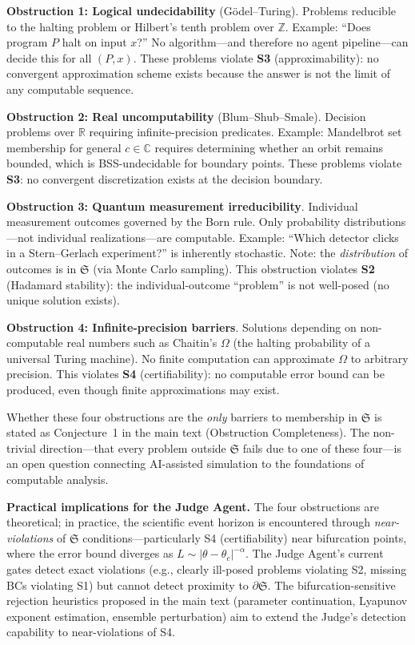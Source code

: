 \documentclass[11pt,a4paper]{article}
\newcommand{\R}{\mathbb{R}}
\newcommand{\Z}{\mathbb{Z}}
\newcommand{\Sclass}{\mathfrak{S}}
\begin{document}
\textbf{Obstruction 1: Logical undecidability} (G\"odel--Turing). Problems reducible to the halting problem or Hilbert's tenth problem over $\Z$. Example: ``Does program $P$ halt on input $x$?'' No algorithm---and therefore no agent pipeline---can decide this for all $(P, x)$. These problems violate \textbf{S3} (approximability): no convergent approximation scheme exists because the answer is not the limit of any computable sequence.

\textbf{Obstruction 2: Real uncomputability} (Blum--Shub--Smale). Decision problems over $\R$ requiring infinite-precision predicates. Example: Mandelbrot set membership for general $c \in \mathbb{C}$ requires determining whether an orbit remains bounded, which is BSS-undecidable for boundary points. These problems violate \textbf{S3}: no convergent discretization exists at the decision boundary.

\textbf{Obstruction 3: Quantum measurement irreducibility}. Individual measurement outcomes governed by the Born rule. Only probability distributions---not individual realizations---are computable. Example: ``Which detector clicks in a Stern--Gerlach experiment?'' is inherently stochastic. Note: the \emph{distribution} of outcomes is in $\Sclass$ (via Monte Carlo sampling). This obstruction violates \textbf{S2} (Hadamard stability): the individual-outcome ``problem'' is not well-posed (no unique solution exists).

\textbf{Obstruction 4: Infinite-precision barriers}. Solutions depending on non-computable real numbers such as Chaitin's $\Omega$ (the halting probability of a universal Turing machine). No finite computation can approximate $\Omega$ to arbitrary precision. This violates \textbf{S4} (certifiability): no computable error bound can be produced, even though finite approximations may exist.

Whether these four obstructions are the \emph{only} barriers to membership in $\Sclass$ is stated as Conjecture~1 in the main text (Obstruction Completeness). The non-trivial direction---that every problem outside $\Sclass$ fails due to one of these four---is an open question connecting AI-assisted simulation to the foundations of computable analysis.

\textbf{Practical implications for the Judge Agent.} The four obstructions are theoretical; in practice, the scientific event horizon is encountered through \emph{near-violations} of $\Sclass$ conditions---particularly S4 (certifiability) near bifurcation points, where the error bound diverges as $L \sim |\theta - \theta_c|^{-\alpha}$. The Judge Agent's current gates detect exact violations (e.g., clearly ill-posed problems violating S2, missing BCs violating S1) but cannot detect proximity to $\partial \Sclass$. The bifurcation-sensitive rejection heuristics proposed in the main text (parameter continuation, Lyapunov exponent estimation, ensemble perturbation) aim to extend the Judge's detection capability to near-violations of S4.
\end{document}
